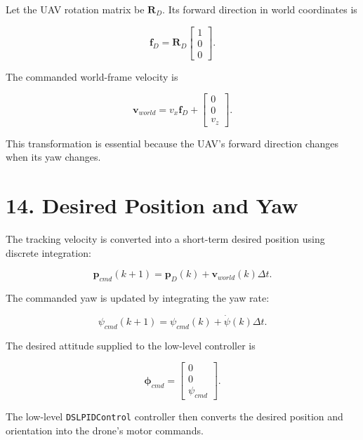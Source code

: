 \documentclass[12pt,a4paper]{article}
\begin{document}
Let the UAV rotation matrix be $\mathbf{R}_D$. Its forward direction in world coordinates is

\begin{equation}
\boxed{
\mathbf{f}_D=
\mathbf{R}_D
\begin{bmatrix}
1\\0\\0
\end{bmatrix}.
}
\end{equation}

The commanded world-frame velocity is

\begin{equation}
\boxed{
\mathbf{v}_{world}
=
v_x\mathbf{f}_D+
\begin{bmatrix}
0\\0\\v_z
\end{bmatrix}.
}
\end{equation}

This transformation is essential because the UAV's forward direction changes when its yaw changes.

\section{14. Desired Position and Yaw}

The tracking velocity is converted into a short-term desired position using discrete integration:

\begin{equation}
\boxed{
\mathbf{p}_{cmd}(k+1)
=
\mathbf{p}_D(k)+
\mathbf{v}_{world}(k)\Delta t.
}
\end{equation}

The commanded yaw is updated by integrating the yaw rate:

\begin{equation}
\boxed{
\psi_{cmd}(k+1)
=
\psi_{cmd}(k)+
\dot{\psi}(k)\Delta t.
}
\end{equation}

The desired attitude supplied to the low-level controller is

\begin{equation}
\boxed{
\boldsymbol{\phi}_{cmd}
=
\begin{bmatrix}
0\\0\\\psi_{cmd}
\end{bmatrix}.
}
\end{equation}

The low-level \texttt{DSLPIDControl} controller then converts the desired position and orientation into the drone's motor commands.
\end{document}
